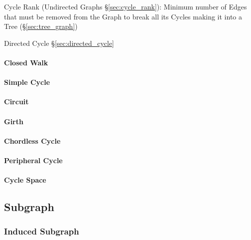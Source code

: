 \fist Cycle Rank (Undirected Graphs \S\ref{sec:cycle_rank}): Minimum number of
Edges that must be removed from the Graph to break all its Cycles making it
into a Tree (\S\ref{sec:tree_graph})

Directed Cycle \S\ref{sec:directed_cycle}



\paragraph{Closed Walk}\label{sec:closed_walk}\hfill

\paragraph{Simple Cycle}\label{sec:simple_cycle}\hfill

\paragraph{Circuit}\label{sec:circuit}\hfill

\paragraph{Girth}\label{sec:girth}\hfill

\paragraph{Chordless Cycle}\label{sec:chordless_cycle}\hfill

\paragraph{Peripheral Cycle}\label{sec:peripheral_cycle}\hfill

\paragraph{Cycle Space}\label{sec:cycle_space}\hfill



\subsection{Subgraph}\label{sec:subgraph}

\subsubsection{Induced Subgraph}\label{sec:induced_subgraph}



